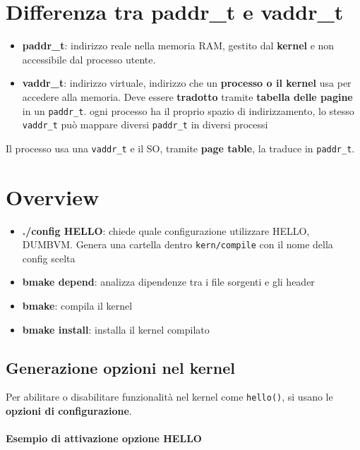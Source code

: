 \section{Differenza tra paddr\_t e vaddr\_t}

\begin{itemize}
  \item \textbf{paddr\_t}:  indirizzo reale nella memoria RAM, gestito dal \textbf{kernel} e non accessibile dal processo utente.
  \item \textbf{vaddr\_t}: indirizzo virtuale, indirizzo che un \textbf{processo o il kernel} usa per accedere alla memoria. Deve essere \textbf{tradotto} tramite \textbf{tabella delle pagine} in un \verb|paddr_t|.
        ogni processo ha il proprio spazio di indirizzamento, lo stesso \verb|vaddr_t| può mappare diversi \verb|paddr_t| in diversi processi
\end{itemize}

Il processo usa una \verb|vaddr_t| e il SO, tramite \textbf{page table}, la traduce in \verb|paddr_t|.

\section{Overview}

\begin{itemize}
  \item \textbf{./config HELLO}: chiede quale configurazione utilizzare HELLO, DUMBVM. Genera una cartella dentro \verb|kern/compile| con il nome della config scelta
  \item \textbf{bmake depend}: analizza dipendenze tra i file sorgenti e gli header
  \item \textbf{bmake}: compila il kernel
  \item \textbf{bmake install}: installa il kernel compilato
\end{itemize}

\subsection{Generazione opzioni nel kernel}

Per abilitare o disabilitare funzionalità nel kernel come \verb|hello()|, si usano le \textbf{opzioni di configurazione}.

\paragraph{Esempio di attivazione opzione HELLO}

